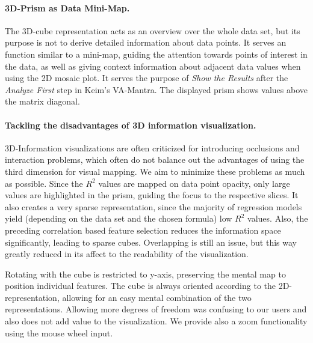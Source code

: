 \documentclass[journal]{style/vgtc} 			          %
\begin{document}
\paragraph{3D-Prism as Data Mini-Map.}
The 3D-cube representation acts as an overview over the whole data set, but its purpose is not to derive detailed information about data points.
It serves an function similar to a mini-map, guiding the attention towards points of interest in the data, as well as giving context information about adjacent data values when using the 2D mosaic plot.
It serves the purpose of \emph{Show the Results} after the \emph{Analyze First} step in Keim's VA-Mantra.
The displayed prism shows values above the matrix diagonal.
\paragraph{Tackling the disadvantages of 3D information visualization.}
3D-Information visualizations are often criticized for introducing occlusions and interaction problems, which often do not balance out the advantages of using the third dimension for visual mapping.
We aim to minimize these problems as much as possible.
Since the $R^2$ values are mapped on data point opacity, only large values are highlighted in the prism, guiding the focus to the respective slices.
It also creates a very sparse representation, since the majority of regression models yield (depending on the data set and the chosen formula) low $R^2$ values.
Also, the preceding correlation based feature selection reduces the information space significantly, leading to sparse cubes.
Overlapping is still an issue, but this way greatly reduced in its affect to the readability of the visualization.

Rotating with the cube is restricted to y-axis, preserving the mental map to position individual features.
The cube is always oriented according to the 2D-representation, allowing for an easy mental combination of the two representations.
Allowing more degrees of freedom was confusing to our users and also does not add value to the visualization.
We provide also a zoom functionality using the mouse wheel input.
\end{document}
